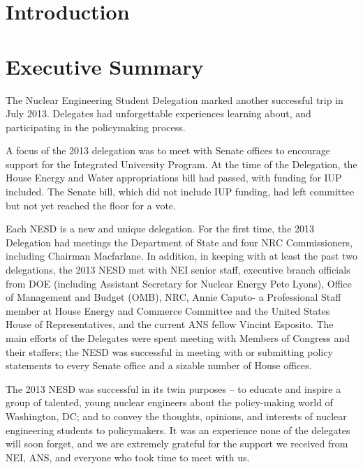 \documentclass[12pt]{article}
\begin{document}


\newpage
\tableofcontents
\thispagestyle{empty}

\begin{doublespace}

\newpage
\setcounter{page}{1} 
\section{Introduction}


\newpage
\section{Executive Summary}

The Nuclear Engineering Student Delegation marked another successful trip in
July 2013.  Delegates had unforgettable experiences learning about, and
participating in the policymaking process.

A focus of the 2013 delegation was to meet with Senate offices to encourage
support for the Integrated University Program.  At the time of the Delegation,
the House Energy and Water appropriations bill had passed, with funding for IUP
included.  The Senate bill, which did not include IUP funding, had left
committee but not yet reached the floor for a vote.

Each NESD is a new and unique delegation. For the first time, the 2013
Delegation had meetings the Department of State and four NRC Commissioners,
including Chairman Macfarlane.  In addition, in keeping with at least the past
two delegations, the 2013 NESD met with NEI senior staff, executive branch
officials from DOE (including Assistant Secretary for Nuclear Energy Pete
Lyons), Office of Management and Budget (OMB), NRC, Annie Caputo- a Professional
Staff member at House Energy and Commerce Committee and the United States House
of Representatives, and the current ANS fellow Vincint Esposito.  The main
efforts of the Delegates were spent meeting with Members of Congress and their
staffers; the NESD was successful in meeting with or submitting policy
statements to every Senate office and a sizable number of House offices.

The 2013 NESD was successful in its twin purposes – to educate and inspire a
group of talented, young nuclear engineers about the policy-making world of
Washington, DC; and to convey the thoughts, opinions, and interests of nuclear
engineering students to policymakers.  It was an experience none of the
delegates will soon forget, and we are extremely grateful for the support we
received from NEI, ANS, and everyone who took time to meet with us.


\end{doublespace}
\end{document}
